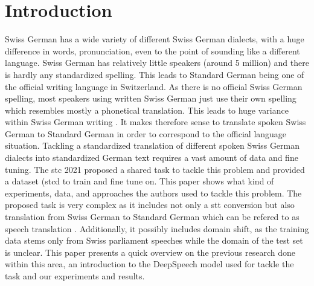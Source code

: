 \section{Introduction}
Swiss German has a wide variety of different Swiss German dialects, with a huge difference in words, pronunciation, even to the point of sounding like a different language. Swiss German has relatively little speakers (around 5 million) and there is hardly any standardized spelling. This leads to Standard German being one of the official writing language in Switzerland. As there is no official Swiss German spelling, most speakers using written Swiss German just use their own spelling which resembles mostly a phonetical translation. This leads to huge variance within Swiss German writing \citep{pluss2020}. It makes therefore sense to translate spoken Swiss German to Standard German in order to correspond to the official language situation. Tackling a standardized translation of different spoken Swiss German dialects into standardized German text requires a vast amount of data and fine tuning. The \gls{stc} 2021 proposed a shared task to tackle this problem and provided a dataset
(\gls{stcd} to train and fine tune on. This paper shows what kind of experiments, data, and approaches the authors used to tackle this problem. The proposed task is very complex as it includes not only a \gls{stt} conversion but also translation from Swiss German to Standard German which can be refered to as speech translation \cite{pluss2020}. Additionally, it possibly includes domain shift, as the training data stems only from Swiss parliament speeches while the domain of the test set is unclear. 
This paper presents a quick overview on the previous research done within this area, an introduction to the DeepSpeech model used for tackle the task and our experiments and results.  
